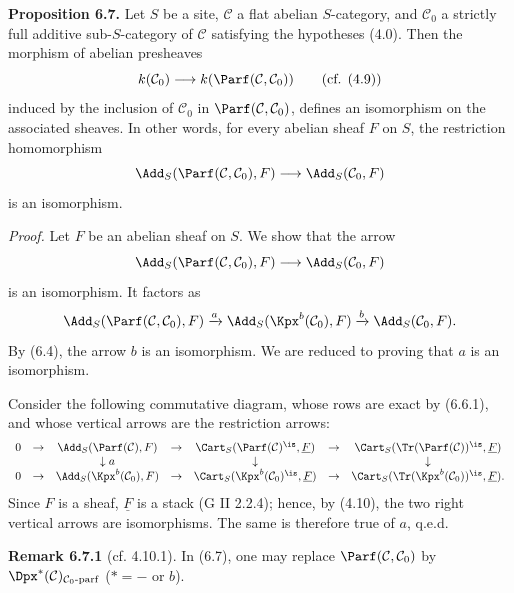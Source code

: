 \textbf{Proposition 6.7.} Let \(S\) be a site, \(\mathcal C\) a flat abelian \(S\)-category, and \(\mathcal C_0\) a strictly full additive sub-\(S\)-category of \(\mathcal C\) satisfying the hypotheses (4.0). Then the morphism of abelian presheaves
\[
  k(\mathcal C_0)\longrightarrow k(\Parf(\mathcal C,\mathcal C_0))\qquad(\text{cf. }(4.9))
\]
induced by the inclusion of \(\mathcal C_0\) in \(\Parf(\mathcal C,\mathcal C_0)\), defines an isomorphism on the associated sheaves. In other words, for every abelian sheaf \(F\) on \(S\), the restriction homomorphism
\[
  \Add_S(\Parf(\mathcal C,\mathcal C_0),F)
  \longrightarrow
  \Add_S(\mathcal C_0,F)
\]
is an isomorphism.

\emph{Proof.} Let \(F\) be an abelian sheaf on \(S\). We show that the arrow
\[
  \Add_S(\Parf(\mathcal C,\mathcal C_0),F)
  \longrightarrow
  \Add_S(\mathcal C_0,F)
\]
is an isomorphism. It factors as
\[
\Add_S(\Parf(\mathcal C,\mathcal C_0),F)
 \xrightarrow{a}
\Add_S(\Kpx^b(\mathcal C_0),F)
 \xrightarrow{b}
\Add_S(\mathcal C_0,F).
\]
By (6.4), the arrow \(b\) is an isomorphism. We are reduced to proving that \(a\) is an isomorphism.

Consider the following commutative diagram, whose rows are exact by (6.6.1), and whose vertical arrows are the restriction arrows:
\[
\begin{array}{ccccccccc}
0&\to&\Add_S(\Parf(\mathcal C),F)&\to&\Cart_S(\Parf(\mathcal C)^{\is},\underline F)&\to&\Cart_S(\Tr(\Parf(\mathcal C))^{\is},\underline F)\\
&&\downarrow a&&\downarrow&&\downarrow\\
0&\to&\Add_S(\Kpx^b(\mathcal C_0),F)&\to&\Cart_S(\Kpx^b(\mathcal C_0)^{\is},\underline F)&\to&\Cart_S(\Tr(\Kpx^b(\mathcal C_0))^{\is},\underline F).
\end{array}
\]
Since \(F\) is a sheaf, \(\underline F\) is a stack (G II 2.2.4); hence, by (4.10), the two right vertical arrows are isomorphisms. The same is therefore true of \(a\), q.e.d.

\textbf{Remark 6.7.1} (cf. 4.10.1). In (6.7), one may replace \(\Parf(\mathcal C,\mathcal C_0)\) by \(\Dpx^*(\mathcal C)_{\mathcal C_0\text{-}\mathrm{parf}}\) (\(*=-\) or \(b\)).

